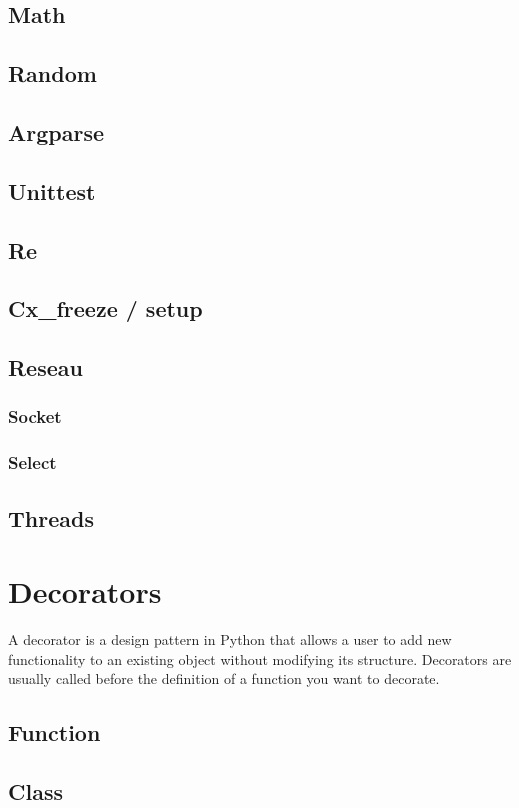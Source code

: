 \documentclass[a4paper, 12pt]{article}
\begin{document}
\subsection{Math}
\subsection{Random}
\subsection{Argparse}
\subsection{Unittest}
\subsection{Re}
\subsection{Cx\_freeze / setup}
\subsection{Reseau}
\subsubsection{Socket}
\subsubsection{Select}
\subsection{Threads}

\newpage
\section{Decorators}
A decorator is a design pattern in Python that allows a user to add new functionality to an existing object without modifying its structure. Decorators are usually called before the definition of a function you want to decorate.\newline
\subsection{Function}
\subsection{Class}
\end{document}
